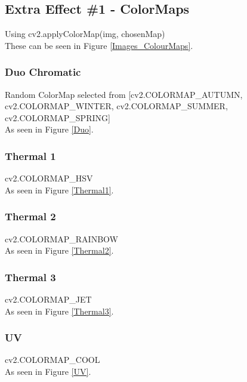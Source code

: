 \documentclass[a4paper,twoside,10pt, twocolumn]{report}
\begin{document}
	\subsection{Extra Effect \#1 - ColorMaps}
	Using cv2.applyColorMap(img, chosenMap)\\
	These can be seen in Figure \ref{Images_ColourMaps}.
	\subsubsection{Duo Chromatic}
	Random ColorMap selected from [cv2.COLORMAP\_AUTUMN, cv2.COLORMAP\_WINTER, cv2.COLORMAP\_SUMMER, cv2.COLORMAP\_SPRING]\\
	As seen in Figure \ref{Duo}.
	\subsubsection{Thermal 1}
	cv2.COLORMAP\_HSV\\
	As seen in Figure \ref{Thermal1}.
	\subsubsection{Thermal 2}
	cv2.COLORMAP\_RAINBOW\\
	As seen in Figure \ref{Thermal2}.
	\subsubsection{Thermal 3}
	cv2.COLORMAP\_JET\\
	As seen in Figure \ref{Thermal3}.
	\subsubsection{UV}
	cv2.COLORMAP\_COOL\\
	As seen in Figure \ref{UV}.
	
\end{document}
